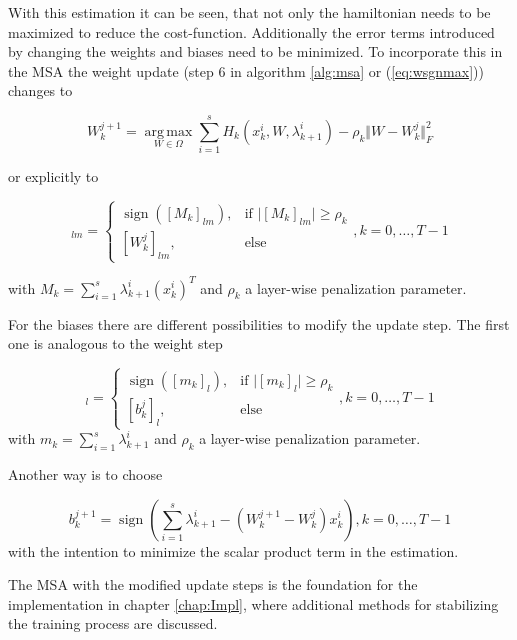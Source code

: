 \documentclass[a4paper, 12pt]{scrreprt} %
\DeclareMathOperator*{\argmax}{arg\,max}
\DeclareMathOperator*{\sign}{sign}
\begin{document}
With this estimation it can be seen, that not only the hamiltonian needs to be maximized to reduce the cost-function. Additionally the error terms introduced by changing the weights and biases need to be minimized. To incorporate this in the \ac{MSA} the weight update (step 6 in algorithm \ref{alg:msa} or (\ref{eq:wsgnmax})) changes to

\begin{equation*}
W_k^{j+1} = \underset{W\in \Omega}{\argmax} \sum_{i=1}^s{H_k(x_k^{i},W,\lambda_{k+1}^{i}) - \rho_k \Vert W - W_k^j \Vert^2_F}
\end{equation*}

or explicitly to

\begin{equation}
[W_k^{j+1}]_{lm} = \begin{cases} \sign\left([M_k]_{lm}\right), & \text{if }\vert[M_k]_{lm} \vert \geq \rho_k \\
																	[W_k^j]_{lm},                & \text{else} \end{cases}
, k=0,\dots,T-1
\label{eq:wsgnmaxpen}
\end{equation}

with $M_k = \sum_{i=1}^s \lambda_{k+1}^i ({x_k^i})^T$ and $\rho_k$ a layer-wise penalization parameter. 

For the biases there are different possibilities to modify the update step. The first one is analogous to the weight step

\begin{equation}
[b_k^{j+1}]_{l} = \begin{cases} \sign\left([m_k]_{l}\right), & \text{if }\vert[m_k]_{l} \vert \geq \rho_k \\
																	[b_k^j]_{l},                & \text{else} \end{cases}
, k=0,\dots,T-1
\label{eq:bsgnmaxpen}
\end{equation}
with $m_k = \sum_{i=1}^s \lambda_{k+1}^i $ and $\rho_k$ a layer-wise penalization parameter. 

Another way is to choose 

\begin{equation}
b_k^{j+1} = \sign\left( \sum_{i=1}^s \lambda_{k+1}^i-(W_k^{j+1}-W_k^j)x_k^i \right), k=0,\dots,T-1
\label{eq:bsgnmaxx}
\end{equation}
 with the intention to minimize the scalar product term in the estimation.\newline

The \ac{MSA} with the modified update steps is the foundation for the implementation in chapter \ref{chap:Impl}, where additional methods for stabilizing the training process are discussed.
\end{document}
